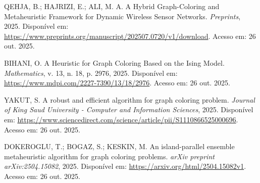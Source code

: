 \documentclass[12pt,a4paper]{article}
\begin{document}
\begin{thebibliography}{99}

QEHJA, B.; HAJRIZI, E.; ALI, M. A. A Hybrid Graph-Coloring and Metaheuristic Framework for Dynamic Wireless Sensor Networks. \textit{Preprints}, 2025. Disponível em: \url{https://www.preprints.org/manuscript/202507.0720/v1/download}. Acesso em: 26 out. 2025.

BIHANI, O. A Heuristic for Graph Coloring Based on the Ising Model. \textit{Mathematics}, v. 13, n. 18, p. 2976, 2025. Disponível em: \url{https://www.mdpi.com/2227-7390/13/18/2976}. Acesso em: 26 out. 2025.

YAKUT, S. A robust and efficient algorithm for graph coloring problem. \textit{Journal of King Saud University - Computer and Information Sciences}, 2025. Disponível em: \url{https://www.sciencedirect.com/science/article/pii/S1110866525000696}. Acesso em: 26 out. 2025.

DOKEROGLU, T.; BOGAZ, S.; KESKIN, M. An island-parallel ensemble metaheuristic algorithm for graph coloring problems. \textit{arXiv preprint arXiv:2504.15082}, 2025. Disponível em: \url{https://arxiv.org/html/2504.15082v1}. Acesso em: 26 out. 2025.

\end{thebibliography}
\end{document}
